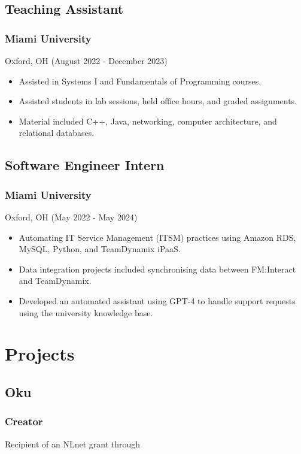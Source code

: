\documentclass[letterpaper,9pt]{extarticle}
\begin{document}
\begin{minipage}[t]{0.60\textwidth}
        \subsection*{Teaching Assistant}
        \subsubsection*{Miami University}
        Oxford, OH (August 2022 - December 2023)\\
        \begin{itemize}
            \item Assisted in Systems I and Fundamentals of Programming courses.
            \item Assisted students in lab sessions, held office hours, and graded assignments.
            \item Material included C++, Java, networking, computer architecture, and relational databases.
        \end{itemize}

        \subsection*{Software Engineer Intern}
        \subsubsection*{Miami University}
        Oxford, OH (May 2022 - May 2024)
        \begin{itemize}
            \item Automating IT Service Management (ITSM) practices using Amazon RDS, MySQL, Python, and TeamDynamix iPaaS.
            \item Data integration projects included synchronising data between FM:Interact and TeamDynamix.
            \item Developed an automated assistant using GPT-4 to handle support requests using the university knowledge base.
        \end{itemize}

        \section*{Projects}
        \subsection*{Oku}
        \subsubsection*{Creator}
        Recipient of an NLnet grant through  


\end{minipage}
\end{document}
